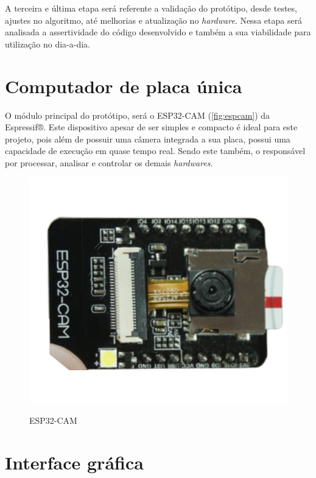 A terceira e última etapa será referente a validação do protótipo, desde testes, 
ajustes no algoritmo, até melhorias e atualização no \textit{hardware}. Nessa etapa será 
analisada a assertividade do código desenvolvido e também a sua viabilidade para
utilização no dia-a-dia.

\section{Computador de placa única}\label{sec:materiais}

O módulo principal do protótipo, será o ESP32-CAM (\autoref{fig:espcam}) da Espressif®. 
Este dispositivo apesar de ser simples e compacto é ideal para este projeto,  
pois além de possuir uma câmera integrada a sua placa, possui uma capacidade de 
execução em quase tempo real. Sendo este também, o responsável por 
processar, analisar e controlar os demais \textit{hardwares}. 

\begin{figure}[h!]
    \centering
    \caption{ESP32-CAM}
    \includegraphics[scale=0.25]{figuras/esp32cam.png} 
    \label{fig:espcam}
    \centering
\end{figure}

\section{Interface gráfica}\label{sec:materiais}

